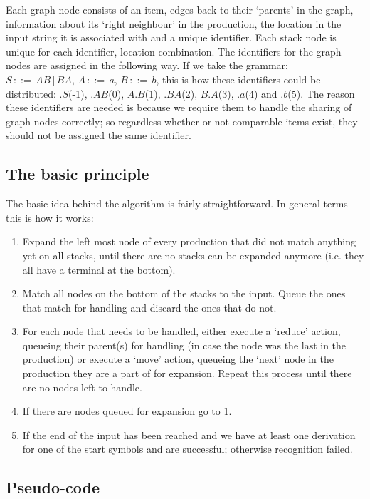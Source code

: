 \documentclass[a4paper,10pt]{article}
\begin{document}
Each graph node consists of an item, edges back to their `parents' in the graph, information about its `right neighbour' in the production, the location in the input string it is associated with and a unique identifier. Each stack node is unique for each identifier, location combination. The identifiers for the graph nodes are assigned in the following way. If we take the grammar: $S\,::=\,AB\,|\,BA,\,A\,::=\,a,\,B\,::=\,b$, this is how these identifiers could be distributed: $.S$(-1), $.AB$(0), $A.B$(1), $.BA$(2), $B.A$(3), $.a$(4) and $.b$(5). The reason these identifiers are needed is because we require them to handle the sharing of graph nodes correctly; so regardless whether or not comparable items exist, they should not be assigned the same identifier.

\subsection{The basic principle}

The basic idea behind the algorithm is fairly straightforward. In general terms this is how it works:

\begin{enumerate}
 \setlength{\itemsep}{0pt}
 \setlength{\parskip}{0pt}
 \setlength{\parsep}{0pt}

 \item Expand the left most node of every production that did not match anything yet on all stacks, until there are no stacks can be expanded anymore (i.e. they all have a terminal at the bottom).
 \item Match all nodes on the bottom of the stacks to the input. Queue the ones that match for handling and discard the ones that do not.
 \item For each node that needs to be handled, either execute a `reduce' action, queueing their parent(s) for handling (in case the node was the last in the production) or execute a `move' action, queueing the `next' node in the production they are a part of for expansion. Repeat this process until there are no nodes left to handle.
 \item If there are nodes queued for expansion go to 1.
 \item If the end of the input has been reached and we have at least one derivation for one of the start symbols and are successful; otherwise recognition failed.
\end{enumerate}

\pagebreak
\subsection{Pseudo-code}
\end{document}
